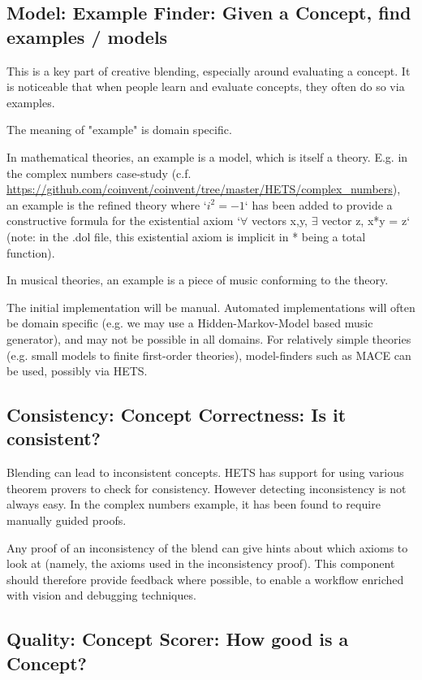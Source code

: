 \subsection{Model: Example Finder: Given a Concept, find examples / models}

This is a key part of creative blending, especially around evaluating a concept. 
It is noticeable that when people learn and evaluate concepts, they often do so via examples.

The meaning of "example" is domain specific.

In mathematical theories, an example is a model, which is itself a theory. 
E.g. in the complex numbers case-study (c.f. \url{https://github.com/coinvent/coinvent/tree/master/HETS/complex_numbers}), 
an example is the refined theory where `$i^2 = -1$` has been added to provide a constructive formula for the existential
axiom `$\forall$ vectors x,y, $\exists$ vector z, x*y = z` (note: in the .dol file, this existential axiom is 
implicit in * being a total function).
 
In musical theories, an example is a piece of music conforming to the theory.
 
The initial implementation will be manual. Automated implementations will often be domain specific (e.g. we may use a Hidden-Markov-Model based music generator), and may not be possible in all domains.
For relatively simple theories (e.g. small models to finite first-order theories), model-finders such as MACE can be used, possibly via HETS.


\subsection{Consistency: Concept Correctness: Is it consistent?}

Blending can lead to inconsistent concepts. HETS has support for using various theorem provers to check for consistency. However detecting inconsistency is not always
easy. In the complex numbers example, it has been found to require manually guided
proofs.

Any proof of an inconsistency of the blend can give hints about which axioms to look at (namely, the axioms used in the inconsistency proof). This component should therefore provide feedback where possible, to enable a workflow enriched with vision and debugging techniques.

\subsection{Quality: Concept Scorer: How good is a Concept?}


